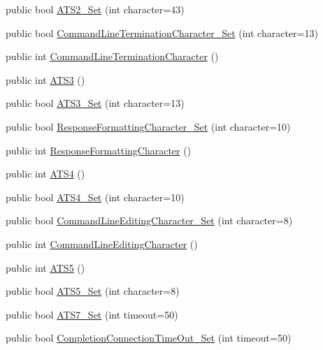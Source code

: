 \begin{DoxyCompactItemize}
\item 
public bool \hyperlink{classedwinspire_1_1Ports_1_1Modem_a5cd39ceedd28163764c88dbf9ed26340}{A\-T\-S2\-\_\-\-Set} (int character=43)
\item 
public bool \hyperlink{classedwinspire_1_1Ports_1_1Modem_ac3bff29454207323e4a035c6f4cababa}{Command\-Line\-Termination\-Character\-\_\-\-Set} (int character=13)
\item 
public int \hyperlink{classedwinspire_1_1Ports_1_1Modem_a99b7d14d9dc27ec252ae731f1ad951dd}{Command\-Line\-Termination\-Character} ()
\item 
public int \hyperlink{classedwinspire_1_1Ports_1_1Modem_a79301cceb9c3d12653e079cd12e15446}{A\-T\-S3} ()
\item 
public bool \hyperlink{classedwinspire_1_1Ports_1_1Modem_add30a16060b369fbab60b48cf6110745}{A\-T\-S3\-\_\-\-Set} (int character=13)
\item 
public bool \hyperlink{classedwinspire_1_1Ports_1_1Modem_aac8ae6113d70b4b9ea6ac6fd99607fc1}{Response\-Formatting\-Character\-\_\-\-Set} (int character=10)
\item 
public int \hyperlink{classedwinspire_1_1Ports_1_1Modem_a7c43d5b2b243b593790ad466b8fbd375}{Response\-Formatting\-Character} ()
\item 
public int \hyperlink{classedwinspire_1_1Ports_1_1Modem_ab6a44eb69ab813101d203fa2ad1239a8}{A\-T\-S4} ()
\item 
public bool \hyperlink{classedwinspire_1_1Ports_1_1Modem_a4ef269ca8e8dc37288f9d3a2f8fd7a5d}{A\-T\-S4\-\_\-\-Set} (int character=10)
\item 
public bool \hyperlink{classedwinspire_1_1Ports_1_1Modem_a4d74d12f34862fd544cb6c865fcdc08d}{Command\-Line\-Editing\-Character\-\_\-\-Set} (int character=8)
\item 
public int \hyperlink{classedwinspire_1_1Ports_1_1Modem_af1dba36513bc0af8e2d9e15997d119f7}{Command\-Line\-Editing\-Character} ()
\item 
public int \hyperlink{classedwinspire_1_1Ports_1_1Modem_ac566b0f32752e5ce87a7cbad878587ec}{A\-T\-S5} ()
\item 
public bool \hyperlink{classedwinspire_1_1Ports_1_1Modem_abb57f1af827b076021f988e68a4417c7}{A\-T\-S5\-\_\-\-Set} (int character=8)
\item 
public bool \hyperlink{classedwinspire_1_1Ports_1_1Modem_acfbb340072f7a0ebfe07fc239652d1ae}{A\-T\-S7\-\_\-\-Set} (int timeout=50)
\item 
public bool \hyperlink{classedwinspire_1_1Ports_1_1Modem_ab12811fff76a814f924feabf33172a8d}{Completion\-Connection\-Time\-Out\-\_\-\-Set} (int timeout=50)

\end{DoxyCompactItemize}
